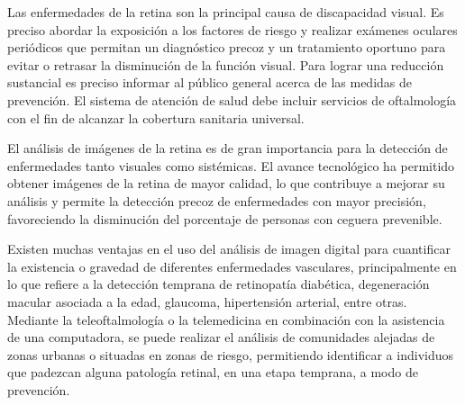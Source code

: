 Las enfermedades de la retina son la principal causa de discapacidad visual. Es preciso abordar la exposici\'on a los factores de riesgo y realizar ex\'amenes oculares peri\'odicos que permitan un diagn\'ostico precoz y un tratamiento oportuno para evitar o retrasar la  disminuci\'on de la funci\'on visual. Para lograr una reducci\'on sustancial es preciso informar al p\'ublico general acerca de las medidas de prevenci\'on. El sistema de atenci\'on de salud debe incluir servicios de oftalmolog\'ia con el fin de alcanzar la cobertura sanitaria universal. \cite{oms:discapcidadVisual}

El an\'alisis de im\'agenes de la retina es de gran importancia para la detecci\'on de enfermedades tanto visuales como sist\'emicas.
El avance tecnol\'ogico ha permitido obtener im\'agenes de la retina de mayor calidad, lo que contribuye a mejorar su an\'alisis y permite la detecci\'on precoz de enfermedades con mayor precisi\'on, favoreciendo la disminuci\'on del porcentaje de personas con ceguera prevenible. \cite{cunha2012imaging}

Existen muchas ventajas en el uso del an\'alisis de imagen digital para cuantificar la existencia o gravedad de diferentes enfermedades vasculares, principalmente en lo que refiere a la detecci\'on temprana de retinopat\'ia diab\'etica, degeneraci\'on macular asociada a la edad,  glaucoma, hipertensi\'on arterial, entre otras.
Mediante la teleoftalmolog\'ia o la telemedicina en combinaci\'on con la asistencia de una computadora, se puede realizar el an\'alisis de comunidades alejadas de zonas urbanas o situadas en zonas de riesgo, permitiendo identificar a individuos que padezcan alguna patolog\'ia retinal, en una etapa temprana, a modo de prevenci\'on. \cite{kanagasingam2014progress}

